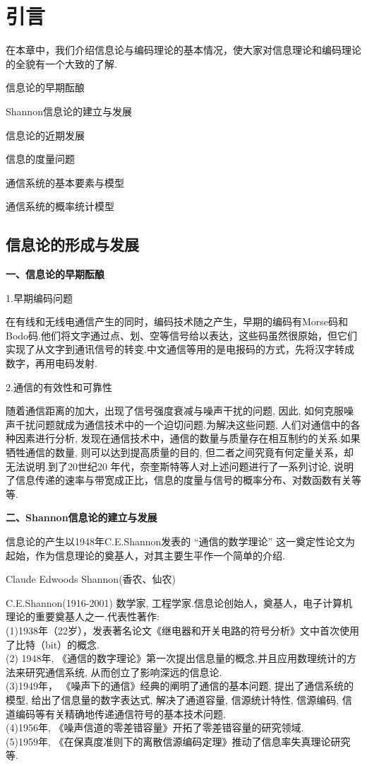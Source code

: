 \chapter{引言}
在本章中，我们介绍信息论与编码理论的基本情况，使大家对信息理论和编码理论的全貌有一个大致的了解.

\begin{introduction}
 \item 信息论的早期酝酿
 \item Shannon信息论的建立与发展
 \item 信息论的近期发展
 \item 信息的度量问题
 \item 通信系统的基本要素与模型
 \item 通信系统的概率统计模型
\end{introduction}
\section{信息论的形成与发展}

\textbf{一、信息论的早期酝酿}

1.早期编码问题

在有线和无线电通信产生的同时，编码技术随之产生，早期的编码有Morse码和Bodo码.他们将文字通过点、划、空等信号给以表达，这些码虽然很原始，但它们实现了从文字到通讯信号的转变.中文通信等用的是电报码的方式，先将汉字转成数字，再用电码发射.

2.通信的有效性和可靠性

随着通信距离的加大，出现了信号强度衰减与噪声干扰的问题, 因此, 如何克服噪声千扰问题就成为通信技术中的一个迫切问题.为解决这些问题, 人们对通信中的各种因素进行分析, 发现在通信技术中，通信的数量与质量存在相互制约的关系.如果牺牲通信的数量, 则可以达到提高质量的目的, 但二者之间究竟有何定量关系，却无法说明.到了20世纪20 年代，奈奎斯特等人对上述问题进行了一系列讨论, 说明了信息传递的速率与带宽成正比，信息的度量与信号的概率分布、对数函数有关等等.

\textbf{二、Shannon信息论的建立与发展}

信息论的产生以1948年C.E.Shannon发表的 “通信的数学理论” 这一奠定性论文为起始，作为信息理论的奠基人，对其主要生平作一个简单的介绍.

Claude Edwoods Shannon(香农、仙农)  

C.E.Shannon(1916-2001) 数学家, 工程学家.信息论创始人，奠基人，电子计算机理论的重要奠基人之一.代表性著作:\\
(1)1938年（22岁），发表著名论文《继电器和开关电路的符号分析》文中首次使用了比特（bit）的概念.\\
(2) 1948年, 《通信的数字理论》第一次提出信息量的概念,并且应用数理统计的方法来研究通信系统, 从而创立了影响深远的信息论.\\
(3)1949年， 《噪声下的通信》经典的阐明了通信的基本问题, 提出了通信系统的模型, 给出了信息量的数字表达式, 解决了通道容量, 信源统计特性, 信源编码, 信道编码等有关精确地传递通信符号的基本技术问题.\\
(4)1956年, 《噪声信道的零差错容量》开拓了零差错容量的研究领域.\\
(5)1959年, 《在保真度准则下的离散信源编码定理》推动了信息率失真理论研究等.

